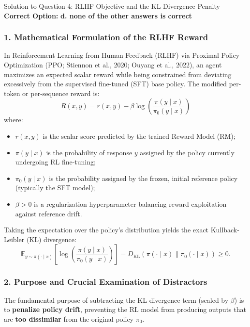 \documentclass[11pt,a4paper]{article}
\begin{document}
\begin{solutionbox}{Solution to Question 4: RLHF Objective and the KL Divergence Penalty}
\textbf{Correct Option:} \textbf{d. none of the other answers is correct}

\subsubsection*{1. Mathematical Formulation of the RLHF Reward}
In Reinforcement Learning from Human Feedback (RLHF) via Proximal Policy Optimization (PPO; Stiennon et al., 2020; Ouyang et al., 2022), an agent maximizes an expected scalar reward while being constrained from deviating excessively from the supervised fine-tuned (SFT) base policy. The modified per-token or per-sequence reward is:
\begin{equation}
R(x, y) = r(x, y) - \beta \log \left( \frac{\pi(y \mid x)}{\pi_0(y \mid x)} \right)
\end{equation}
where:
\begin{itemize}[noitemsep]
    \item $r(x, y)$ is the scalar score predicted by the trained Reward Model (RM);
    \item $\pi(y \mid x)$ is the probability of response $y$ assigned by the policy currently undergoing RL fine-tuning;
    \item $\pi_0(y \mid x)$ is the probability assigned by the frozen, initial reference policy (typically the SFT model);
    \item $\beta > 0$ is a regularization hyperparameter balancing reward exploitation against reference drift.
\end{itemize}

Taking the expectation over the policy's distribution yields the exact Kullback-Leibler (KL) divergence:
\begin{equation}
\mathbb{E}_{y \sim \pi(\cdot \mid x)} \left[ \log \left( \frac{\pi(y \mid x)}{\pi_0(y \mid x)} \right) \right] = D_{\text{KL}}\left(\pi(\cdot \mid x) \parallel \pi_0(\cdot \mid x)\right) \ge 0.
\end{equation}

\subsubsection*{2. Purpose and Crucial Examination of Distractors}
The fundamental purpose of subtracting the KL divergence term (scaled by $\beta$) is to \textbf{penalize policy drift}, preventing the RL model from producing outputs that are \textbf{too dissimilar} from the original policy $\pi_0$. 


\end{solutionbox}
\end{document}

